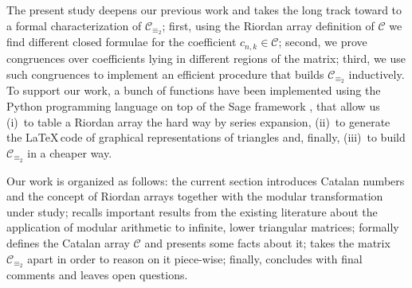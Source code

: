 The present study deepens our previous work \cite{merlini:nocentini:lecco} and
takes the long track toward to a formal characterization of
$\mathcal{C}_{\equiv_{2}}$; first, using the Riordan array definition of
$\mathcal{C}$ we find different closed formulae for the coefficient
$c_{n,k}\in\mathcal{C}$; second, we prove congruences over coefficients lying
in different regions of the matrix; third, we use such congruences to implement
an efficient procedure that builds $\mathcal{C}_{\equiv_{2}}$ inductively.
To support our work, a bunch of functions have been implemented using the
Python programming language on top of the Sage framework \cite{sage}, that
allow us (i)~to table a Riordan array the hard way by series expansion, (ii)~to
generate the \LaTeX\,code of graphical representations of triangles and, finally,
(iii)~to build $\mathcal{C}_{\equiv_{2}}$ in a cheaper way.




Our work is organized as follows: the current section introduces Catalan
numbers and the concept of Riordan arrays together with the modular
transformation under study;  recalls important results
from the existing literature about the application of modular arithmetic to
infinite, lower triangular matrices;  formally defines
the Catalan array $\mathcal{C}$ and presents some facts about it;
 takes the matrix $\mathcal{C}_{\equiv_{2}}$
apart in order to reason on it piece-wise; finally, 
concludes with final comments and leaves open questions.

\vfill
